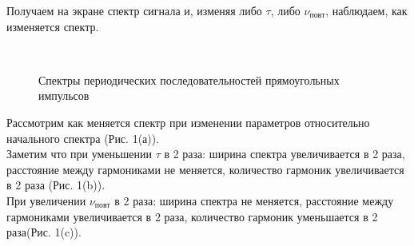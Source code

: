 \documentclass[a4paper, 12pt]{article}%
\begin{document}
	Получаем на экране спектр сигнала и, изменяя либо $\tau$, либо $\nu_{повт}$, наблюдаем, как изменяется спектр.
	\begin{figure}[H]
		\centering
		\\
		\qquad
		\caption{Спектры периодических последовательностей прямоугольных импульсов}
	\end{figure}
	Рассмотрим как меняется спектр при изменении параметров относительно начального спектра (Рис. 1(а)).\\
	Заметим что при уменьшении $\tau$ в 2 раза: ширина спектра увеличивается в 2 раза, расстояние между гармониками не меняется, количество гармоник увеличивается в 2 раза (Рис. 1(b)).\\
	При увеличении $\nu_{повт}$ в 2 раза: ширина спектра не меняется, расстояние между гармониками увеличивается в 2 раза, количество гармоник уменьшается в 2 раза(Рис. 1(c)).\\
\end{document}
